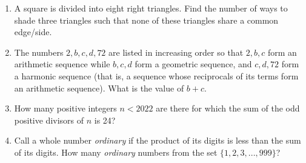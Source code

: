 \documentclass[11pt,paper=letter]{scrartcl}
\begin{document}
\begin{enumerate}[label=\textbf{\arabic*}.]
   
   \newpage
   
   \item A square is divided into eight right triangles. Find the number of ways to shade three triangles such that none of these triangles share a common edge/side.
   
   \begin{center}
 



   \end{center}
   
   
\item The numbers $2,b,c,d,72$ are listed in increasing order so that $2,b,c$ form an arithmetic sequence while $b,c,d$ form a geometric sequence, and $c,d,72$ form a harmonic sequence (that is, a sequence whose reciprocals of its terms form an arithmetic sequence). What is the value of $b+c.$


\item How many positive integers $n<2022$ are there for which the sum of the odd positive divisors of $n$ is 24?


\item Call a whole number \textit{ordinary} if the product of its digits is less than the sum of its digits. How many \textit{ordinary} numbers from the set $\{1,2,3,...,999\}$?


\end{enumerate}
\end{document}
